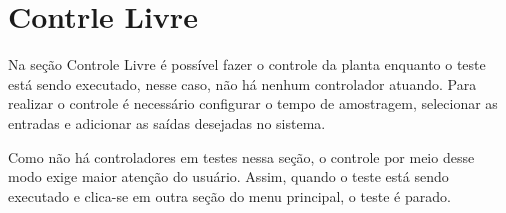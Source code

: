 
\chapter{Contrle Livre}%
\label{chapter:controle-livre}

Na seção Controle Livre é possível fazer o controle da planta enquanto o teste
está sendo executado, nesse caso, não há nenhum controlador atuando. Para
realizar o controle é necessário configurar o tempo de amostragem, selecionar as
entradas e adicionar as saídas desejadas no sistema. 

Como não há controladores em testes nessa seção, o controle por meio desse modo
exige maior atenção do usuário. Assim, quando o teste está sendo executado e
clica-se em outra seção do menu principal, o teste é parado.
